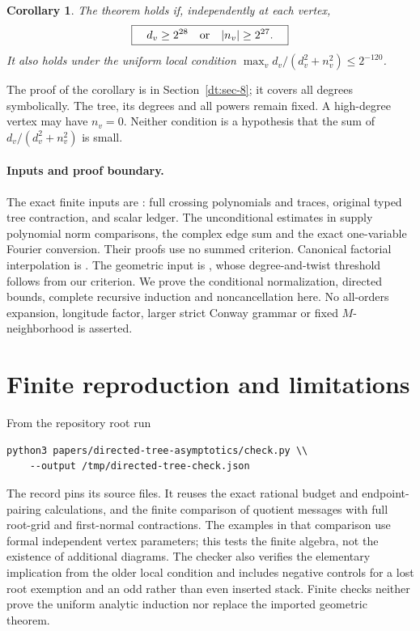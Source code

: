 \documentclass[11pt]{article}
\numberwithin{equation}{section}
\newtheorem{corollary}[theorem]{Corollary}
\theoremstyle{definition}\newtheorem{definition}[theorem]{Definition}
\theoremstyle{remark}\newtheorem{remark}[theorem]{Remark}
\begin{document}
\begin{corollary}\label{dt:mixed}
The theorem holds if, independently at each vertex,
\[
 \boxed{\quad d_v\ge2^{28}\quad\hbox{or}\quad |n_v|\ge2^{27}.\quad}
\]
It also holds under the uniform local condition
\(\max_v d_v/(d_v^2+n_v^2)\le2^{-120}\).
\end{corollary}
The proof of the corollary is in Section~\ref{dt:sec-8}; it covers all
degrees symbolically. The tree, its degrees and all powers remain fixed.
A high-degree vertex may have \(n_v=0\). Neither condition is a
hypothesis that the sum of \(d_v/(d_v^2+n_v^2)\) is small.

\paragraph{Inputs and proof boundary.}
The exact finite inputs are \cite[Proposition~6.1, Theorem~7.1 and
Proposition~8.1]{Meridian}: full crossing polynomials and traces, original
typed tree contraction, and scalar ledger. The unconditional estimates
in \cite[Lemma~2.1, Sections~3--4 and Section~6.1]{Summed} supply
polynomial norm comparisons, the complex edge sum and the exact
one-variable Fourier conversion. Their proofs use no summed criterion.
Canonical factorial interpolation is \cite[Lemma~2.1]{Factorial}.
The geometric input is \cite[Theorem~1.1]{Geometry}, whose degree-and-twist
threshold follows from our criterion. We prove the conditional
normalization, directed bounds, complete recursive induction and
noncancellation here. No all-orders expansion, longitude factor, larger
strict Conway grammar or fixed \(M\)-neighborhood is asserted.






\section{Finite reproduction and limitations}\label{dt:reproduction}
From the repository root run
\begin{verbatim}
python3 papers/directed-tree-asymptotics/check.py \\
    --output /tmp/directed-tree-check.json
\end{verbatim}
The record pins its source files. It reuses the exact rational budget
and endpoint-pairing calculations, and the finite comparison of quotient
messages with full root-grid and first-normal contractions. The examples
in that comparison use formal independent vertex parameters; this tests
the finite algebra, not the existence of additional diagrams.
The checker also verifies the elementary implication from the older
local condition and includes negative controls for a lost root
exemption and an odd rather than even inserted stack. Finite checks
neither prove the uniform analytic induction nor replace the imported
geometric theorem.
\end{document}
